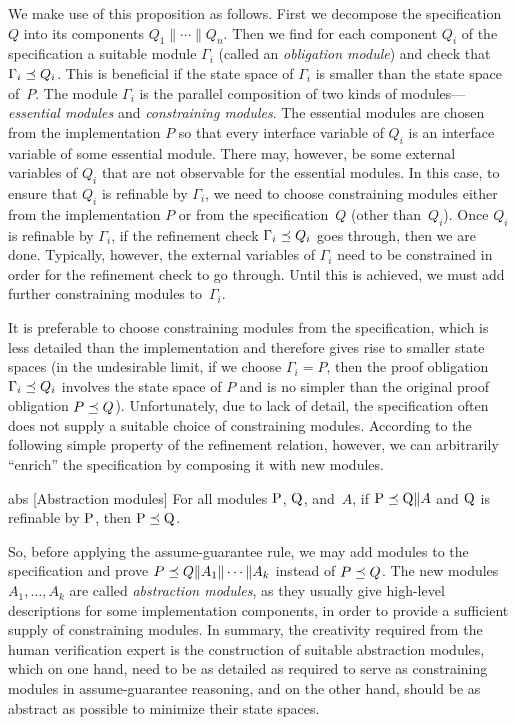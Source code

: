 \mypar
\noindent
We make use of this proposition as follows.  First we decompose the
specification $Q$ into its components $Q_1 \| \cdots \| Q_n$.  Then we find for
each component $Q_i$ of the specification a suitable module $\Gamma_i$
(called an {\em obligation module}) and check that $\Gamma_i\preceq Q_i$.
This is beneficial if the state space of $\Gamma_i$ is smaller than the state
space of~$P$.  The module $\Gamma_i$ is the parallel composition of two kinds
of modules---{\em essential modules\/} and {\em constraining modules}.  The
essential modules are chosen from the implementation $P$ so that every
interface variable of $Q_i$ is an interface variable of some essential
module.  There may, however, be some external variables of $Q_i$ that are not
observable for the essential modules.  In this case, to ensure that $Q_i$ is
refinable by $\Gamma_i$, we need to choose constraining modules either
from the implementation $P$ or from the specification~$Q$ (other than~$Q_i$).
Once $Q_i$ is refinable by $\Gamma_i$, if the refinement check
$\Gamma_i\preceq Q_i$ goes through, then we are done.  Typically, however,
the external variables of $\Gamma_i$ need to be constrained in order for the
refinement check to go through.  Until this is achieved, we must add further
constraining modules to~$\Gamma_i$.

\mypar
It is preferable to choose constraining modules from the specification, which
is less detailed than the implementation and therefore gives rise to smaller
state spaces (in the undesirable limit, if we choose $\Gamma_i=P$, then the
proof obligation $\Gamma_i\preceq Q_i$ involves the state space of $P$ and
is no simpler than the original proof obligation $P\preceq Q$).
Unfortunately, due to lack of detail, the specification often does not supply
a suitable choice of constraining modules.  According to the following simple
property of the refinement relation, however, we can arbitrarily ``enrich''
the specification by composing it with new modules.

\begin{proposition}{abs}
  [Abstraction modules]
  For all modules $\mbox{P}$, $\mbox{Q}$, and~$A$,
  if $\mbox{P}\preceq\mbox{Q}\|A$ and $\mbox{Q}$ is refinable by $\mbox{P}$, then
  $\mbox{P}\preceq\mbox{Q}$. 
\end{proposition}

\mypar
\noindent
So, before applying the assume-guarantee rule, we may add modules to the
specification and prove $P\preceq Q\|A_1\|\cdots\|A_k$ instead of $P\preceq
Q$.  The new modules $A_1,\ldots,A_k$ are called {\em abstraction modules},
as they usually give high-level descriptions for some implementation
components, in order to provide a sufficient supply of constraining modules.
In summary, the creativity required from the human verification expert is the
construction of suitable abstraction modules, which on one hand, need to be
as detailed as required to serve as constraining modules in assume-guarantee
reasoning, and on the other hand, should be as abstract as possible to
minimize their state spaces.

